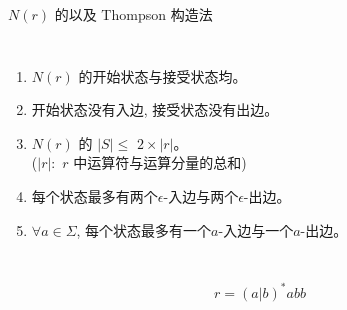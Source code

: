 \begin{frame}{}
  \begin{center}
    $N(r)$ 的以及 Thompson 构造法
  \end{center}

  \vspace{0.30cm}
  \begin{columns}
      \begin{enumerate}
        \setlength{\itemsep}{8pt}
        \item $N(r)$ 的开始状态与接受状态均。
        \item 开始状态没有入边, 接受状态没有出边。
        \pause
		\vspace{5pt}
        \item $N(r)$ 的 $|S| \le$ $2 \times |r|$。\\
          ($|r|:$ $r$ 中运算符与运算分量的总和)
        \pause
		\vspace{5pt}
        \item 每个状态最多有两个$\epsilon$-入边与两个$\epsilon$-出边。
        \item $\forall a \in \Sigma$, 每个状态最多有一个$a$-入边与一个$a$-出边。
      \end{enumerate}
  \end{columns}
\end{frame}

\begin{frame}{}
  \[
    r = (a | b)^{\ast} abb
  \]

  \pause
  \begin{columns}
      \pause
  \end{columns}

  \begin{columns}
      \pause
      \pause
  \end{columns}
\end{frame}
